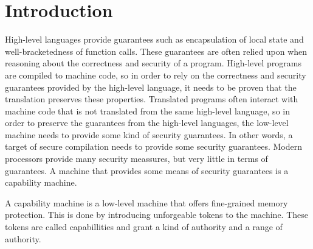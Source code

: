 \documentclass[compsoc,conference,letterpaper,fleqn]{IEEEtran}
\begin{document}
\section{Introduction}
\label{sec:introduction}
%
\begin{comment}
  Security on processors is today subject to an arms race between
  processor manufacturers and hackers. On the hacker side, a constant
  effort is put into exploiting current processor designs and
  circumventing the security measures set in place to prevent known
  exploits. On the processor manufacturer side, new security measures
  are put in place to prevent new exploits. The arms race would come
  to a grinding halt if the security meassures provided more than
  obstacles and actually provided low-level security guarantees. One
  kind of low-level machines that provide low-level security is a
  capability machine.
\end{comment}
High-level languages provide guarantees such as encapsulation of local
state and well-bracketedness of function calls. These guarantees are
often relied upon when reasoning about the correctness and security of
a program. High-level programs are compiled to machine code, so in
order to rely on the correctness and security guarantees provided by
the high-level language, it needs to be proven that the translation
preserves these properties. Translated programs often interact with
machine code that is not translated from the same high-level language,
so in order to preserve the guarantees from the high-level languages,
the low-level machine needs to provide some kind of security
guarantees. In other words, a target of secure compilation needs to
provide some security guarantees. Modern processors provide many
security meassures, but very little in terms of guarantees. A machine
that provides some means of security guarantees is a capability machine.




A capability machine is a low-level machine that offers fine-grained
memory protection.
This is done by introducing unforgeable tokens to
the machine. These tokens are called capabillities and grant a kind of
authority and a range of authority. 
\end{document}
